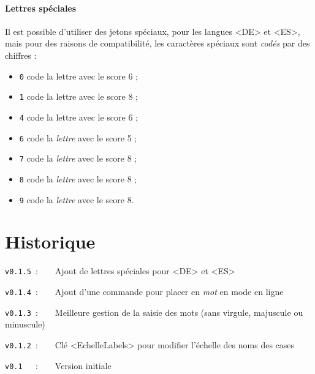 \documentclass{article}
\begin{document}
\newpage

\subsection{Lettres spéciales}

Il est possible d'utiliser des jetons spéciaux, pour les langues \textsf{<DE>} et \textsf{<ES>}, mais pour des raisons de compatibilité, les caractères spéciaux sont \textit{codés} par des chiffres :

\begin{itemize}
	\item \texttt{0} code la lettre  avec le score 6 ;
	\item \texttt{1} code la lettre  avec le score 8 ;
	\item \texttt{4} code la lettre  avec le score 6 ;
	\item \texttt{6} code la \textit{lettre}  avec le score 5 ;
	\item \texttt{7} code la \textit{lettre}  avec le score 8 ;
	\item \texttt{8} code la \textit{lettre}  avec le score 8 ;
	\item \texttt{9} code la \textit{lettre}  avec le score 8.
\end{itemize}

\begin{PresentationCode}{}
{\Huge {}}

{\Huge {}}
\end{PresentationCode}

\newpage

\part*{Historique}

\verb|v0.1.5|~:~~~~Ajout de lettres spéciales pour \textsf{<DE>} et \textsf{<ES>}

\verb|v0.1.4|~:~~~~Ajout d'une commande pour placer en \textit{mot} en mode \og en ligne \fg

\verb|v0.1.3|~:~~~~Meilleure gestion de la saisie des mots (sans virgule, majuscule ou minuscule)

\verb|v0.1.2|~:~~~~Clé \textsf{<EchelleLabels>} pour modifier l'échelle des noms des cases

\verb|v0.1  |~:~~~~Version initiale
\end{document}

